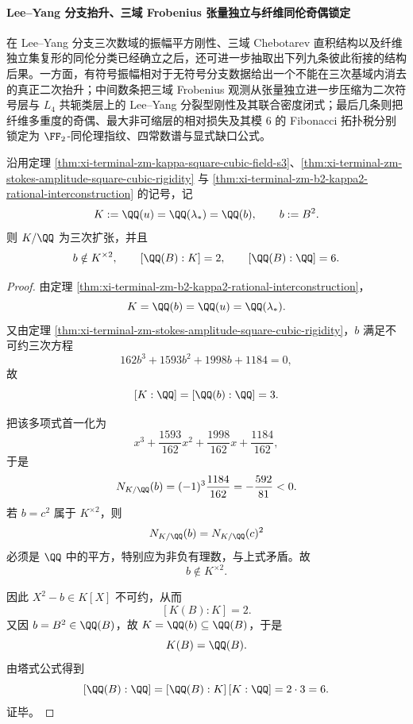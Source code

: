 \paragraph{Lee--Yang 分支抬升、三域 Frobenius 张量独立与纤维同伦奇偶锁定}
在 Lee--Yang 分支三次数域的振幅平方刚性、三域 Chebotarev 直积结构以及纤维独立集复形的同伦分类已经确立之后，还可进一步抽取出下列九条彼此衔接的结构后果。一方面，有符号振幅相对于无符号分支数据给出一个不能在三次基域内消去的真正二次抬升；中间数条把三域 Frobenius 观测从张量独立进一步压缩为二次符号层与 \(L_4\) 共轭类层上的 Lee--Yang 分裂型刚性及其联合密度闭式；最后几条则把纤维多重度的奇偶、最大非可缩层的相对损失及其模 \(6\) 的 Fibonacci 拓扑税分别锁定为 \(\FF_2\)-同伦理指纹、四常数谱与显式缺口公式。

\begin{theorem}\label{thm:xi-time-part62d-leyang-signed-amplitude-exact-degree6}
沿用定理 \ref{thm:xi-terminal-zm-kappa-square-cubic-field-s3}、\ref{thm:xi-terminal-zm-stokes-amplitude-square-cubic-rigidity} 与 \ref{thm:xi-terminal-zm-b2-kappa2-rational-interconstruction} 的记号，记
\[
K:=\QQ(u)=\QQ(\lambda_*)=\QQ(b),
\qquad
b:=B^2.
\]
则 \(K/\QQ\) 为三次扩张，并且
\[
b\notin K^{\times 2},
\qquad
[\QQ(B):K]=2,
\qquad
[\QQ(B):\QQ]=6.
\]
\end{theorem}
\begin{proof}
由定理 \ref{thm:xi-terminal-zm-b2-kappa2-rational-interconstruction}，
\[
K=\QQ(b)=\QQ(u)=\QQ(\lambda_*).
\]
又由定理 \ref{thm:xi-terminal-zm-stokes-amplitude-square-cubic-rigidity}，\(b\) 满足不可约三次方程
\[
162b^3+1593b^2+1998b+1184=0,
\]
故
\[
[K:\QQ]=[\QQ(b):\QQ]=3.
\]

把该多项式首一化为
\[
x^3+\frac{1593}{162}x^2+\frac{1998}{162}x+\frac{1184}{162},
\]
于是
\[
N_{K/\QQ}(b)=(-1)^3\frac{1184}{162}=-\frac{592}{81}<0.
\]
若 \(b=c^2\) 属于 \(K^{\times 2}\)，则
\[
N_{K/\QQ}(b)=N_{K/\QQ}(c)^2
\]
必须是 \(\QQ\) 中的平方，特别应为非负有理数，与上式矛盾。故
\[
b\notin K^{\times 2}.
\]

因此 \(X^2-b\in K[X]\) 不可约，从而
\[
[K(B):K]=2.
\]
又因 \(b=B^2\in \QQ(B)\)，故 \(K=\QQ(b)\subseteq \QQ(B)\)，于是
\[
K(B)=\QQ(B).
\]
由塔式公式得到
\[
[\QQ(B):\QQ]=[\QQ(B):K]\,[K:\QQ]=2\cdot 3=6.
\]
证毕。
\end{proof}

